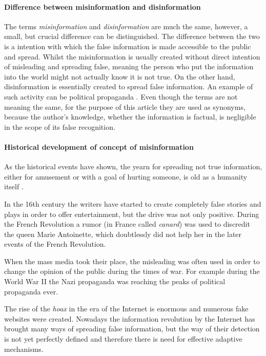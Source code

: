 \documentclass[11pt ,english,a4paper]{article}
\begin{document}
\paragraph{Difference between misinformation and disinformation}
The terms \emph{misinformation} and \emph{disinformation} are much the same, however, a small, but crucial difference can be distinguished. The difference between the two is a intention with which the false information is made accessible to the public and spread. Whilst the misinformation is usually created without direct intention of misleading and spreading false, meaning the person who put the information into the world might not actually know it is not true. On the other hand, disinformation is essentially created to spread false information. An example of such activity can be political propaganda \cite{gu20misinfo} \cite{cook15misinfo}. Even though the terms are not meaning the same, for the purpose of this article they are used as synonyms, because the author's knowledge, whether the information is factual, is negligible in the scope of its false recognition.

\paragraph{Historical development of concept of misinformation}%
As the historical events have shown, the yearn for spreading not true information, either for amusement or with a goal of hurting someone, is old as a humanity itself \cite{bur17history}.

In the 16th century the writers have started to create completely false stories and plays in order to offer entertainment, but the drive was not only positive. During the French Revolution a rumor (in France called \emph{canard}) was used to discredit the queen Marie Antoinette, which doubtlessly did not help her in the later events of the French Revolution. \cite{bur17history} 

When the mass media took their place, the misleading was often used in order to change the opinion of the public during the times of war. For example during the World War II the Nazi propaganda was reaching the peaks of political propaganda ever. \cite{pos18short}

The rise of the \emph{hoax} in the era of the Internet is enormous and numerous fake websites were created.\cite{bur17history} Nowadays the information revolution by the Internet has brought many ways of spreading false information, but the way of their detection is not yet perfectly defined and therefore there is need for effective adaptive mechanisms.
\end{document}

